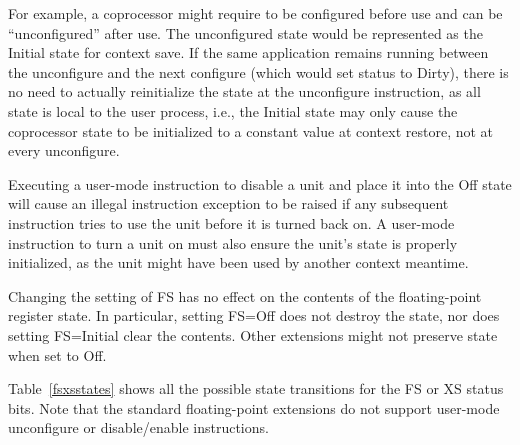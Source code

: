 For example, a coprocessor might require to be configured before use
and can be ``unconfigured'' after use.  The unconfigured state would
be represented as the Initial state for context save.  If the same
application remains running between the unconfigure and the next
configure (which would set status to Dirty), there is no need to
actually reinitialize the state at the unconfigure instruction, as all
state is local to the user process, i.e., the Initial state may only
cause the coprocessor state to be initialized to a constant value at
context restore, not at every unconfigure.

Executing a user-mode instruction to disable a unit and place it into
the Off state will cause an illegal instruction exception to be raised
if any subsequent instruction tries to use the unit before it is
turned back on.  A user-mode instruction to turn a unit on must also
ensure the unit's state is properly initialized, as the unit might
have been used by another context meantime.

Changing the setting of FS has no effect on the contents of the floating-point
register state.  In particular, setting FS=Off does not destroy the state, nor
does setting FS=Initial clear the contents.  Other extensions might not
preserve state when set to Off.

Table~\ref{fsxsstates} shows all the possible state transitions for
the FS or XS status bits.  Note that the standard floating-point
extensions do not support user-mode unconfigure or disable/enable
instructions.

